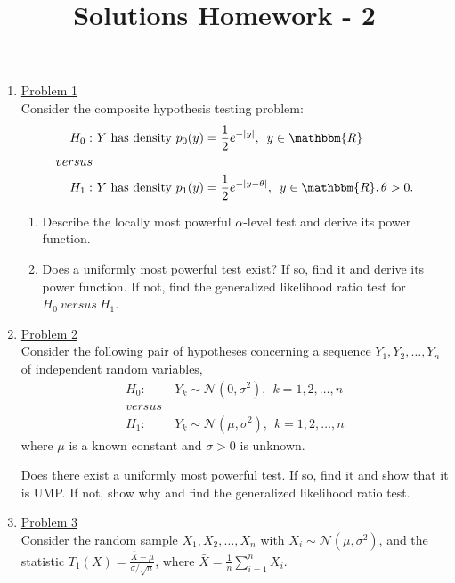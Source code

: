 \documentclass[a4paper,english,12pt]{article}
\title{Solutions Homework - 2}
\author{}
\begin{document}
\maketitle

\begin{enumerate}
\item \hyperlink{solution1}{Problem 1}\\
Consider the composite hypothesis testing problem:
\begin{align*}
H_0:&~Y~\mbox{has density }p_0(y)=\frac{1}{2}e^{-|y|},\hspace{5pt}y\in \mathbbm{R}\\
versus&\\
H_1:&~Y~\mbox{has density }p_1(y)=\frac{1}{2}e^{-|y-\theta|},\hspace{5pt}y\in \mathbbm{R},\theta>0.
\end{align*}
\begin{enumerate}
\item Describe the locally most powerful $\alpha$-level test and derive its power function.
\item Does a uniformly most powerful test exist? If so, find it and derive its power function. If not, find the generalized likelihood ratio test for $H_0~versus~H_1$.
\end{enumerate}
\item \hyperlink{solution2}{Problem 2}\\
Consider the following pair of hypotheses concerning a sequence $Y_1,Y_2,\dots,Y_n$ of independent random variables,
\begin{align*}
H_0:&~Y_k\sim \mathcal{N}(0,\sigma^2),\hspace{5pt}k=1,2,\dots,n\\
versus&\\
H_1:&~Y_k\sim \mathcal{N}(\mu,\sigma^2),\hspace{5pt}k=1,2,\dots,n
\end{align*}
where $\mu$ is a known constant and $\sigma>0$ is unknown.
\par Does there exist a uniformly most powerful test. If so, find it and show that it is UMP. If not, show why and find the generalized likelihood ratio test.
\item \hyperlink{solution3}{Problem 3}\\
Consider the random sample $X_1,X_2,\dots,X_n$ with $X_i\sim \mathcal{N}(\mu,\sigma^2)$, and the statistic $T_1(X)=\frac{\bar{X}-\mu}{\sigma/\sqrt{n}}$, where  $\bar{X}=\frac{1}{n}\sum\limits_{i=1}^{n} X_i$.
\begin{enumerate}

\end{enumerate}
\end{enumerate}
\end{document}
